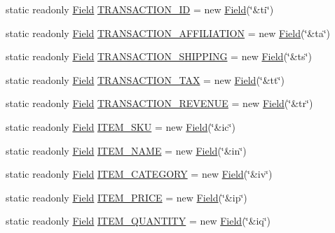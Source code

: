 \begin{DoxyCompactItemize}
\item 
static readonly \hyperlink{class_field}{Field} \hyperlink{class_fields_a00faf7081730a43ef0673fdd114ff1d2}{T\+R\+A\+N\+S\+A\+C\+T\+I\+O\+N\+\_\+\+ID} = new \hyperlink{class_field}{Field}(\char`\"{}\&ti\char`\"{})
\item 
static readonly \hyperlink{class_field}{Field} \hyperlink{class_fields_a71bb198b9d0f1cf36fac2199c79e9c8f}{T\+R\+A\+N\+S\+A\+C\+T\+I\+O\+N\+\_\+\+A\+F\+F\+I\+L\+I\+A\+T\+I\+ON} = new \hyperlink{class_field}{Field}(\char`\"{}\&ta\char`\"{})
\item 
static readonly \hyperlink{class_field}{Field} \hyperlink{class_fields_a1beb6da6e89230f0db16fab99f8669b3}{T\+R\+A\+N\+S\+A\+C\+T\+I\+O\+N\+\_\+\+S\+H\+I\+P\+P\+I\+NG} = new \hyperlink{class_field}{Field}(\char`\"{}\&ts\char`\"{})
\item 
static readonly \hyperlink{class_field}{Field} \hyperlink{class_fields_a1a218b8f42f565a41ebecd2b734082c9}{T\+R\+A\+N\+S\+A\+C\+T\+I\+O\+N\+\_\+\+T\+AX} = new \hyperlink{class_field}{Field}(\char`\"{}\&tt\char`\"{})
\item 
static readonly \hyperlink{class_field}{Field} \hyperlink{class_fields_a5e8a4da1bdaaa872a178dfc27aac40e3}{T\+R\+A\+N\+S\+A\+C\+T\+I\+O\+N\+\_\+\+R\+E\+V\+E\+N\+UE} = new \hyperlink{class_field}{Field}(\char`\"{}\&tr\char`\"{})
\item 
static readonly \hyperlink{class_field}{Field} \hyperlink{class_fields_ab6f385f079f3b78086bb3cea4ef07e85}{I\+T\+E\+M\+\_\+\+S\+KU} = new \hyperlink{class_field}{Field}(\char`\"{}\&ic\char`\"{})
\item 
static readonly \hyperlink{class_field}{Field} \hyperlink{class_fields_a1c7d1d20a3ce416464e49a003d2d274f}{I\+T\+E\+M\+\_\+\+N\+A\+ME} = new \hyperlink{class_field}{Field}(\char`\"{}\&in\char`\"{})
\item 
static readonly \hyperlink{class_field}{Field} \hyperlink{class_fields_af8e38ac9fd8142175ba4c7a39d340799}{I\+T\+E\+M\+\_\+\+C\+A\+T\+E\+G\+O\+RY} = new \hyperlink{class_field}{Field}(\char`\"{}\&iv\char`\"{})
\item 
static readonly \hyperlink{class_field}{Field} \hyperlink{class_fields_a6c41c5d7a3d333e4a1d780cb4d3e8eef}{I\+T\+E\+M\+\_\+\+P\+R\+I\+CE} = new \hyperlink{class_field}{Field}(\char`\"{}\&ip\char`\"{})
\item 
static readonly \hyperlink{class_field}{Field} \hyperlink{class_fields_a78ffb850057d66c0f2b31f8555c48d0f}{I\+T\+E\+M\+\_\+\+Q\+U\+A\+N\+T\+I\+TY} = new \hyperlink{class_field}{Field}(\char`\"{}\&iq\char`\"{})

\end{DoxyCompactItemize}
